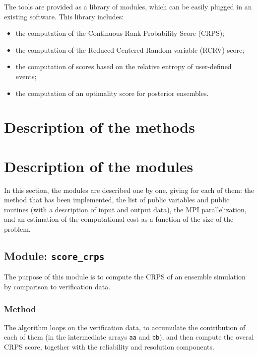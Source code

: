 \documentclass[11pt]{article}
\begin{document}
The tools are provided as a library of modules,
which can be easily plugged in an existing software.
This library includes:

\begin{itemize}
\item the computation of the Continuous Rank Probability Score (CRPS);
\item the computation of the Reduced Centered Random variable (RCRV) score;
\item the computation of scores based on the relative entropy of user-defined events;
\item the computation of an optimality score for posterior ensembles.
\end{itemize}

\clearpage

\pagestyle{plain}

\section{Description of the methods}

\clearpage

\section{Description of the modules}

In this section,
the modules are described one by one,
giving for each of them:
the method that has been implemented,
the list of public variables and public routines
(with a description of input and output data),
the MPI parallelization, and
an estimation of the computational cost
as a function of the size of the problem.

\subsection{Module: {\tt\bf score\_crps}}

The purpose of this module is to compute the CRPS
of an ensemble simulation by comparison to verification data.

\subsubsection*{Method}

The algorithm loops on the verification data,
to accumulate the contribution of each of them
(in the intermediate arrays {\tt aa} and {\tt bb}),
and then compute the overal CRPS score,
together with the reliability and resolution components.
\end{document}
